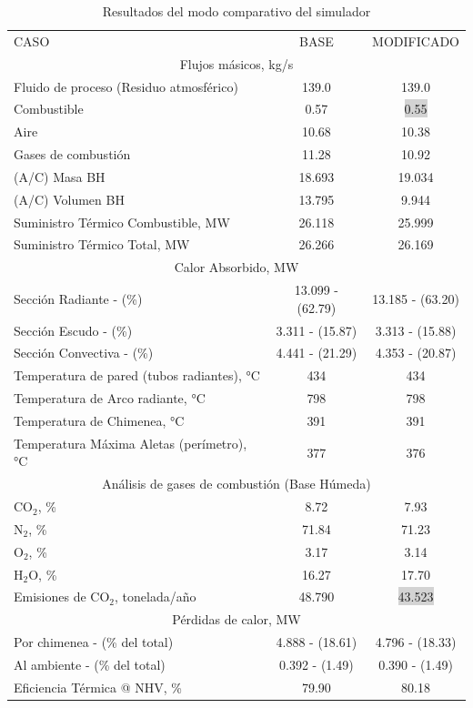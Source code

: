\begin{table}[H]
\caption{Resultados del modo comparativo del simulador}
\label{tbl:comparison-r}
\centering
\begin{tabular}{l|c|c}
\text{    } CASO & BASE & MODIFICADO \\
\multicolumn{3}{c}{Flujos másicos,  kg/s} \\
Fluido de proceso (Residuo atmosférico)   &139.0         &139.0  \\
Combustible           &0.57 &\colorbox{lightgray}{0.55} \\
Aire                  &10.68         &10.38  \\
Gases de combustión   &11.28         &10.92  \\
\hline
(A/C) Masa BH        &18.693 &19.034 \\
(A/C) Volumen BH     &13.795 &9.944  \\
\hline
Suministro Térmico Combustible,  MW  &26.118 &25.999 \\
Suministro Térmico Total,  MW        &26.266 &26.169 \\
\hline
\multicolumn{3}{c}{Calor Absorbido,  MW}\\
Sección Radiante - (\%)  &13.099 - (62.79) &13.185 - (63.20)\\
Sección Escudo - (\%)    &3.311 - (15.87)  &3.313 - (15.88) \\
Sección Convectiva - (\%)&4.441 - (21.29)  &4.353 - (20.87) \\
\hline
Temperatura de pared (tubos radiantes), °C &434  &434  \\
Temperatura de Arco radiante, °C         &798  &798  \\
Temperatura de Chimenea, °C              &391  &391  \\
Temperatura Máxima Aletas (perímetro), °C &377  &376  \\
\hline
\multicolumn{3}{c}{Análisis de gases de combustión (Base Húmeda)}\\
CO$_2$, \%     &8.72    &7.93    \\
N$_2$, \%      &71.84   &71.23   \\
O$_2$, \%      &3.17    &3.14    \\
H$_2$O, \%     &16.27   &17.70   \\
\hline
Emisiones de CO$_2$, tonelada/año &48.790  &\colorbox{lightgray}{43.523} \\
\hline
\multicolumn{3}{c}{Pérdidas de calor,  MW}\\
Por chimenea - (\% del total)&4.888 - (18.61) &4.796 - (18.33) \\
Al ambiente - (\% del total) &0.392 - (1.49)  &0.390 - (1.49) \\
\hline
Eficiencia Térmica @ NHV, \%  &79.90 &80.18 \\
\end{tabular}
\end{table}

